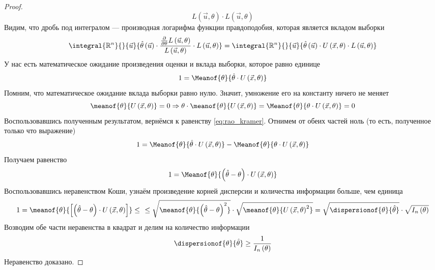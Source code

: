 \begin{proof}
\begin{equation*}
{      {L\left( \vec{u},\theta \right)}
        \cdot L\left( \vec{u},\theta \right)}
  \end{equation*}
  Видим, что дробь под интегралом --- производная логарифма
  функции правдоподобия, которая является вкладом выборки
  \begin{equation*}
    \integral{\mathbb{R}^n}{}{\vec{u}}{\hat{\theta}\left( \vec{u} \right)
      \cdot \frac{
        \frac{\partial}{\partial \theta}L\left( \vec{u},\theta \right)}
        {L\left( \vec{u},\theta \right)}
          \cdot L\left( \vec{u},\theta \right)}
    = \integral{\mathbb{R}^n}{}{\vec{u}}{\hat{\theta}\left( \vec{u} \right)
      \cdot
        U\left( \vec{x},\theta \right)
          \cdot L\left( \vec{u},\theta \right)}
  \end{equation*}
  У нас есть математическое ожидание произведения оценки и вклада выборки,
  которое равно единице
  \begin{equation}\label{eq:rao_kramer}
    1 = \Meanof{\theta}{\hat{\theta}\cdot U\left( \vec{x},\theta \right)}
  \end{equation}
  Помним, что математическое ожидание вклада выборки равно нулю.
  Значит, умножение его на константу ничего не меняет
  \begin{equation*}
    \meanof{\theta}{U\left( \vec{x},\theta \right)}=0
    \Rightarrow 
    \theta\cdot\meanof{\theta}{U\left( \vec{x},\theta \right)}
    = \Meanof{\theta}{\theta\cdot U\left(\vec{x},\theta\right)}
    = 0
  \end{equation*}
  Воспользовавшись полученным результатом, вернёмся к равенству
  \eqref{eq:rao_kramer}.
  Отнимем от обеих частей ноль (то есть, полученное только что выражение)
  \begin{equation*}
    1 = \Meanof{\theta}{\hat{\theta}\cdot U\left( \vec{x},\theta \right)}
      - \Meanof{\theta}{\theta\cdot U\left(\vec{x},\theta\right)}
  \end{equation*}
  Получаем равенство
  \begin{equation*}
    1 = \Meanof{\theta}{\left(\hat{\theta}-\theta\right)
    \cdot U\left( \vec{x},\theta \right)}
  \end{equation*}
  Воспользовавшись неравенством Коши, узнаём
  произведение корней дисперсии и количества информации больше, чем единица
  \begin{equation}\label{eq:rao_kramer_koshi}
    \begin{split}
    1 = \meanof{\theta}{
      \left[\left(\hat{\theta}-\theta\right)
        \cdot U\left( \vec{x},\theta \right)\right]} \le \ \
    \le \sqrt{\meanof{\theta}{
      \left(\hat{\theta}-\theta\right)^2}}
      \cdot\sqrt{\meanof{\theta}{U\left( \vec{x},\theta \right)^2}}
    = \sqrt{\dispersionof{\theta}{\hat{\theta}}}
      \cdot\sqrt{I_n\left(\theta\right)}
    \end{split}
  \end{equation}
  Возводим обе части неравенства в квадрат и делим на количество информации
  \begin{equation*}
    \dispersionof{\theta}{\hat{\theta}} \ge \frac{1}{I_n\left( \theta \right)}
  \end{equation*}
  Неравенство доказано.
\end{proof}
